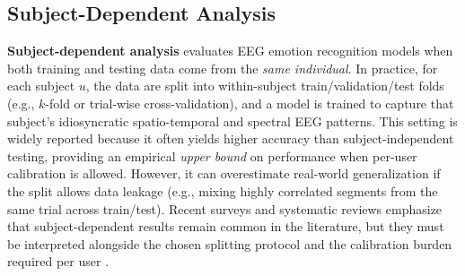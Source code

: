 \documentclass{WileyMSP-template}
\begin{document}
\subsection{Subject-Dependent Analysis}
\label{sec:subject_dependent_analysis}
\textbf{Subject-dependent analysis} evaluates EEG emotion recognition models when both training and testing data come from the \emph{same individual}. In practice, for each subject $u$, the data are split into within-subject train/validation/test folds (e.g., $k$-fold or trial-wise cross-validation), and a model is trained to capture that subject's idiosyncratic spatio-temporal and spectral EEG patterns. This setting is widely reported because it often yields higher accuracy than subject-independent testing, providing an empirical \emph{upper bound} on performance when per-user calibration is allowed. However, it can overestimate real-world generalization if the split allows data leakage (e.g., mixing highly correlated segments from the same trial across train/test). Recent surveys and systematic reviews emphasize that subject-dependent results remain common in the literature, but they must be interpreted alongside the chosen splitting protocol and the calibration burden required per user \cite{wang2024csur_researchprogress,apicella2024neucom_systematic,geng2025dlreview}.
\end{document}
